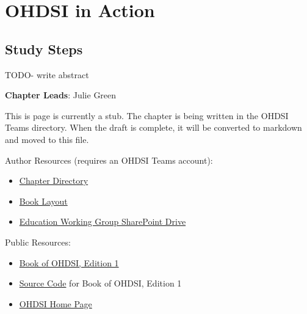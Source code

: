 \documentclass[
  letterpaper,
  paper=7in:10in,
  pagesize=pdftex,
  headinclude=on,
  footinclude=on,
  12pt]{scrbook}
\providecommand{\tightlist}{%
  \setlength{\itemsep}{0pt}\setlength{\parskip}{0pt}}\usepackage{longtable,booktabs,array}
\begin{document}
\part{OHDSI in Action}

\chapter{Study Steps}\label{sec-action-therapeutic}

TODO- write abstract

\hfill\break

\textbf{Chapter Leads}: Julie Green

\begin{tcolorbox}[enhanced jigsaw, opacitybacktitle=0.6, coltitle=black, colback=white, bottomrule=.15mm, bottomtitle=1mm, title=\textcolor{quarto-callout-note-color}{\faInfo}\hspace{0.5em}{Note}, titlerule=0mm, rightrule=.15mm, colbacktitle=quarto-callout-note-color!10!white, colframe=quarto-callout-note-color-frame, toptitle=1mm, arc=.35mm, left=2mm, breakable, opacityback=0, leftrule=.75mm, toprule=.15mm]

This is page is currently a stub. The chapter is being written in the
OHDSI Teams directory. When the draft is complete, it will be converted
to markdown and moved to this file.

Author Resources (requires an OHDSI Teams account):

\begin{itemize}
\tightlist
\item
  \href{https://ohdsiorg.sharepoint.com/sites/Workgroup-EducationWorkingGroup/Shared\%20Documents/Forms/AllItems.aspx?id=\%2Fsites\%2FWorkgroup\%2DEducationWorkingGroup\%2FShared\%20Documents\%2FSection\%20VI\%20\%2D\%20Special\%20Therapeutic\%20Areas\%2FChapter\%2023\%20Special\%20Therapeutic\%20Areas&viewid=05fec2cc\%2Dec8a\%2D4d04\%2Db565\%2Dcf1289b96f67}{Chapter
  Directory}
\item
  \href{https://ohdsiorg.sharepoint.com/:x:/r/sites/Workgroup-EducationWorkingGroup/_layouts/15/Doc2.aspx?action=edit&sourcedoc=\%7B1fa31e39-1c5f-4918-b878-609ebd9810b3\%7D&wdOrigin=TEAMS-WEB.teamsSdk_ns.rwc&wdExp=TEAMS-TREATMENT&wdhostclicktime=1748104477731&web=1}{Book
  Layout}
\item
  \href{https://ohdsiorg.sharepoint.com/sites/Workgroup-EducationWorkingGroup/Shared\%20Documents/Forms/AllItems.aspx?viewid=05fec2cc\%2Dec8a\%2D4d04\%2Db565\%2Dcf1289b96f67}{Education
  Working Group SharePoint Drive}
\end{itemize}

Public Resources:

\begin{itemize}
\tightlist
\item
  \href{https://ohdsi.github.io/TheBookOfOhdsi/}{Book of OHDSI, Edition
  1}
\item
  \href{https://github.com/OHDSI/TheBookOfOhdsi}{Source Code} for Book
  of OHDSI, Edition 1
\item
  \href{https://ohdsi.org/}{OHDSI Home Page}
\end{itemize}

\end{tcolorbox}
\end{document}
